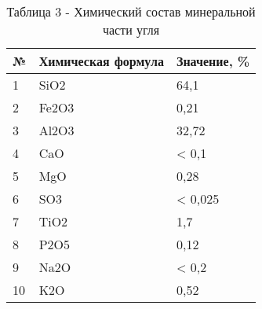 \begin{table}[H]
\caption*{Таблица 3 - Химический состав минеральной части угля}
\centering
\begin{tabular}{|l|l|l|}
\hline
№ & Химическая формула & Значение, \% \\ \hline
1 & SiO2 & 64,1 \\ \hline
2 & Fe2O3 & 0,21 \\ \hline
3 & Al2O3 & 32,72 \\ \hline
4 & CaO & < 0,1 \\ \hline
5 & MgO & 0,28 \\ \hline
6 & SO3 & < 0,025 \\ \hline
7 & TiO2 & 1,7 \\ \hline
8 & P2O5 & 0,12 \\ \hline
9 & Na2O & < 0,2 \\ \hline
10 & K2O & 0,52 \\ \hline
\end{tabular}
\end{table}

